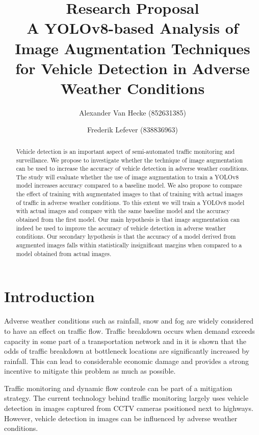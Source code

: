 \documentclass[]{article}
\title{Research Proposal \\
	A YOLOv8-based Analysis of Image Augmentation Techniques for Vehicle Detection in Adverse Weather Conditions}
\author{
		Alexander Van Hecke \small(852631385) \and 
		Frederik Lefever    \small(838836963)}
\begin{document}
\maketitle

\begin{abstract}
	Vehicle detection is an important aspect of semi-automated traffic monitoring and surveillance.  We propose to investigate whether the technique of image augmentation can be used to increase the accuracy of vehicle detection in adverse weather conditions.  The study will evaluate whether the use of image augmentation to train a YOLO\small{v8} model increases accuracy compared to a baseline model.  We also propose to compare the effect of training with augmentated images to that of training with actual images of traffic in adverse weather conditions. To this extent we will train a YOLO\small{v8} model with actual images and compare with the same baseline model and the accuracy obtained from the first model. Our main hypothesis is that image augmentation can indeed be used to improve the accuracy of vehicle detection in adverse weather conditions. Our secondary hypothesis is that the accuracy of a model derived from augmented images falls within statistically insignificant margins when compared to a model obtained from actual images.  
\end{abstract}

\section{Introduction}

	Adverse weather conditions such as rainfall, snow and fog are widely considered to have an effect on traffic flow. Traffic breakdown occurs when demand exceeds capacity in some part of a transportation network and in \cite{stralenInfluenceAdverseWeather2015} it is shown that the odds of traffic breakdown at bottleneck locations are significantly increased by rainfall.  This can lead to considerable economic damage and provides a strong incentive to mitigate this problem as much as possible.
	
	Traffic monitoring and dynamic flow controle can be part of a mitigation strategy. The current technology behind traffic monitoring largely uses vehicle detection in images captured from CCTV cameras positioned next to highways. However, vehicle detection in images can be influenced by adverse weather conditions.
	
\end{document}
